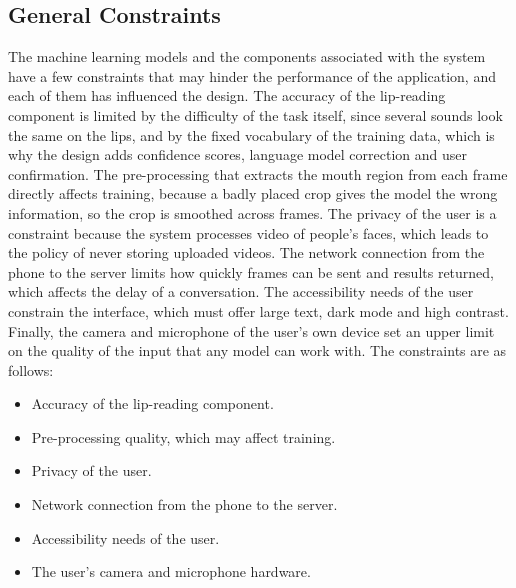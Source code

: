 \documentclass{FastFyp}
\begin{document}
\subsection{General Constraints}
The machine learning models and the components associated with the system have a few constraints that may hinder the performance of the application, and each of them has influenced the design. The accuracy of the lip-reading component is limited by the difficulty of the task itself, since several sounds look the same on the lips, and by the fixed vocabulary of the training data, which is why the design adds confidence scores, language model correction and user confirmation. The pre-processing that extracts the mouth region from each frame directly affects training, because a badly placed crop gives the model the wrong information, so the crop is smoothed across frames. The privacy of the user is a constraint because the system processes video of people's faces, which leads to the policy of never storing uploaded videos. The network connection from the phone to the server limits how quickly frames can be sent and results returned, which affects the delay of a conversation. The accessibility needs of the user constrain the interface, which must offer large text, dark mode and high contrast. Finally, the camera and microphone of the user's own device set an upper limit on the quality of the input that any model can work with. The constraints are as follows:
\begin{itemize}
\item Accuracy of the lip-reading component.
\item Pre-processing quality, which may affect training.
\item Privacy of the user.
\item Network connection from the phone to the server.
\item Accessibility needs of the user.
\item The user's camera and microphone hardware.
\end{itemize}
\end{document}
